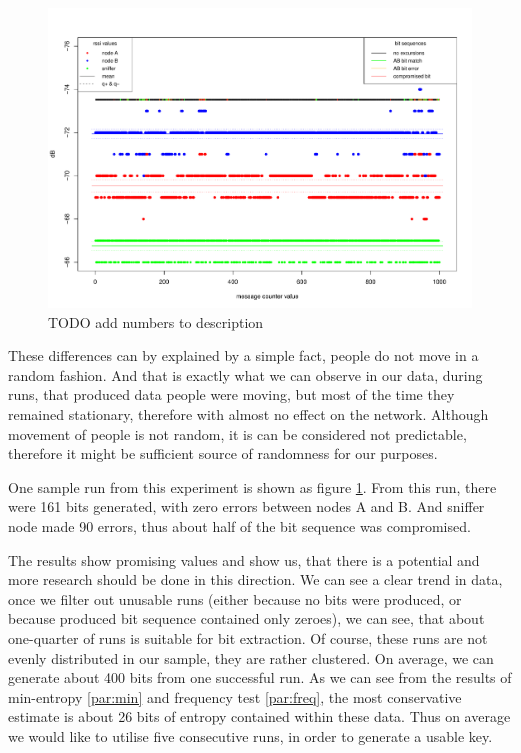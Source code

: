 \documentclass[
  print, %
  table,   %
  nolof,     %
  nolot,     %
           oneside
]{fithesis3}
\begin{document}
  \begin{figure}
    \includegraphics[height=\textwidth, angle = 90]{../images/graph_rssi_04.pdf}
  \caption{TODO add numbers to description}
  \label{fig:rssi_04}
  \end{figure}


  These differences can by explained by a simple fact, people do not move in a random fashion. And that is exactly what we can observe in our data, during runs, that produced data people were moving, but most of the time they remained stationary, therefore with almost no effect on the network. Although movement of people is not random, it is can be considered not predictable, therefore it might be sufficient source of randomness for our purposes.


  One sample run from this experiment is shown as figure \ref{fig:rssi_04}. From this run, there were 161 bits generated, with zero errors between nodes A and B. And sniffer node made 90 errors, thus about half of the bit sequence was compromised.

  The results show promising values and show us, that there is a potential and more research should be done in this direction. We can see a clear trend in data, once we filter out unusable runs (either because no bits were produced, or because produced bit sequence contained only zeroes), we can see, that about one-quarter of runs is suitable for bit extraction. Of course, these runs are not evenly distributed in our sample, they are rather clustered. On average, we can generate about 400 bits from one successful run. As we can see from the results of min-entropy \ref{par:min} and frequency test \ref{par:freq}, the most conservative estimate is about 26 bits of entropy contained within these data. Thus on average we would like to utilise five consecutive runs, in order to generate a usable key.
\end{document}
